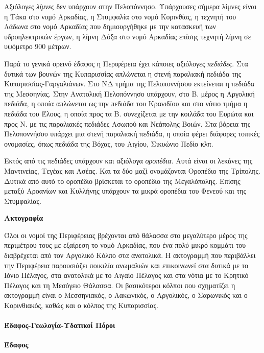 \documentclass[12pt]{article}
\begin{document}
	Αξιόλογες \emph{λίμνες} δεν υπάρχουν στην Πελοπόννησο. Υπάρχουσες σήμερα λίμνες είναι η Τάκα στο νομό Αρκαδίας, η Στυμφαλία στο νομό Κορινθίας, η τεχνητή του Λάδωνα στο νομό Αρκαδίας που δημιουργήθηκε με την κατασκευή των υδροηλεκτρικών έργων, η λίμνη Δόξα στο νομό Αρκαδίας επίσης τεχνητή λίμνη σε υψόμετρο 900 μέτρων.
	
	Παρά το γενικά ορεινό έδαφος η Περιφέρεια έχει κάποιες αξιόλογες \emph{πεδιάδες}. Στα δυτικά των βουνών της Κυπαρισσίας απλώνεται η στενή παραλιακή πεδιάδα της Κυπαρισσίας-Γαργαλιάνων. Στο ΝΔ τμήμα της Πελοποννήσου εκτείνεται η πεδιάδα της Μεσσηνίας. Στην Ανατολική Πελοπόννησο υπάρχουν, στο Β. μέρος η Αργολική πεδιάδα, η οποία απλώνεται ως την πεδιάδα του Κρανιδίου και στο νότιο τμήμα η πεδιάδα του Έλους, η οποία προς τα Β. συνεχίζεται με την κοιλάδα του Ευρώτα και προς Ν. με τις παραλιακές πεδιάδες Ασωπού και Νεάπολης Βοιών. Στα βόρεια της Πελοποννήσου υπάρχει μια στενή παραλιακή πεδιάδα, η οποία φέρει διάφορες τοπικές ονομασίες, όπως πεδιάδα της Βόχας, του Αιγίου, Σικυώνιο Πεδίο κλπ.
	
	Εκτός από τις πεδιάδες υπάρχουν και αξιόλογα \emph{οροπέδια}. Αυτά είναι οι λεκάνες της Μαντινείας, Τεγέας και Ασέας. Και τα δύο μαζί ονομάζονται Οροπέδιο της Τρίπολης. Δυτικά από αυτό το οροπέδιο βρίσκεται το οροπέδιο της Μεγαλόπολης. Επίσης μεταξύ Αροανίων και Κυλλήνης υπάρχουν τα μικρά οροπέδια του Φενεού και της Στυμφαλίας.
	
	\textbf{Ακτογραφία}
	
	Όλοι οι νομοί της Περιφέρειας βρέχονται από θάλασσα στο μεγαλύτερο μέρος της περιμέτρου τους με εξαίρεση το νομό Αρκαδίας, που ένα πολύ μικρό κομμάτι του διαβρέχεται από τον Αργολικό Κόλπο στα ανατολικά. Η ακτογραμμή που περιβάλλει την Περιφέρεια παρουσιάζει ποικιλία ανωμαλιών και επικοινωνεί στα δυτικά με το Ιόνιο Πέλαγος, στα ανατολικά με το Αιγαίο Πέλαγος και στα νότια με το Κρητικό Πέλαγος και τη Μεσόγειο Θάλασσα. Οι βασικότεροι κόλποι που σχηματίζει η ακτογραμμή είναι ο Μεσσηνιακός, ο Λακωνικός, ο Αργολικός, ο Σαρωνικός και ο Κορινθιακός, καθώς και ο κόλπος της Κυπαρισσίας.
	
	\paragraph{Έδαφος-Γεωλογία-Υδατικοί Πόροι}
	
	\textbf{Έδαφος}
	
\end{document}
